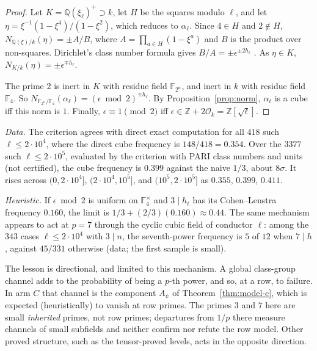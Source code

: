 \begin{proof}
Let $K=\mathbb Q(\xi_\ell)^+\supset k$, let $H$ be the squares modulo
$\ell$, and let $\eta=\xi^{-1}(1-\xi^4)/(1-\xi^2)$, which reduces to
$\alpha_\ell$.  Since $4\in H$ and $2\notin H$,
$N_{\mathbb Q(\xi)/k}(\eta)=\pm A/B$, where $A=\prod_{a\in H}(1-\xi^a)$ and
$B$ is the product over non-squares.  Dirichlet's class number formula
gives $B/A=\pm\epsilon^{\pm2h_\ell}$ \cite{washington1997}.  As
$\eta\in K$, $N_{K/k}(\eta)=\pm\epsilon^{\mp h_\ell}$.

The prime $2$ is inert in $K$ with residue field $\mathbb F_{2^n}$, and inert
in $k$ with residue field $\mathbb F_4$.  So
$N_{\mathbb F_{2^n}/\mathbb F_4}(\alpha_\ell)=(\epsilon\bmod2)^{\mp h_\ell}$.
By Proposition~\ref{prop:norm}, $\alpha_\ell$ is a cube iff this norm is
$1$.  Finally, $\epsilon\equiv1\pmod2$ iff $\epsilon\in\mathbb Z+2\mathcal
O_k=\mathbb Z[\sqrt\ell]$.
\end{proof}

\emph{Data.}  The criterion agrees with direct exact computation for all
$418$ such $\ell\leq2\cdot10^4$, where the direct cube frequency is
$148/418=0.354$.  Over the $3377$ such $\ell\leq2\cdot10^5$, evaluated by
the criterion with PARI class numbers and units (not certified), the cube
frequency is $0.399$ against the naive $1/3$, about $8\sigma$.  It rises
across $(0,2\cdot10^4]$, $(2\cdot10^4,10^5]$, and $(10^5,2\cdot10^5]$ as
$0.355$, $0.399$, $0.411$.

\emph{Heuristic.}  If $\epsilon\bmod2$ is uniform on $\mathbb F_4^{\times}$
and $3\mid h_\ell$ has its Cohen--Lenstra frequency $0.160$, the limit is
$1/3+(2/3)(0.160)\approx0.44$.  The same mechanism appears to act at $p=7$
through the cyclic cubic field of conductor $\ell$: among the $343$ cases
$\ell\leq2\cdot10^4$ with $3\mid n$, the seventh-power frequency is $5$ of
$12$ when $7\mid h$, against $45/331$ otherwise (data; the first sample is
small).

The lesson is directional, and limited to this mechanism.  A global
class-group channel adds to the probability of being a $p$-th power, and
so, at a row, to failure.  In arm $C$ that channel is the component $A_\psi$
of Theorem~\ref{thm:model-c}, which is expected (heuristically) to vanish at
row primes.  The primes $3$ and $7$ here are small \emph{inherited} primes,
not row primes; departures from $1/p$ there measure channels of small
subfields and neither confirm nor refute the row model.  Other proved
structure, such as the tensor-proved levels, acts in the opposite direction.

